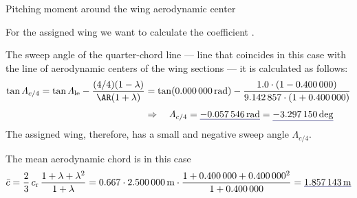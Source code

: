 \documentclass[[12pt,twoside]{book}
\begin{document}
\begin{myExampleX}{Pitching moment around the wing aerodynamic center}{}
\smallskip
\noindent
{}

\smallskip
\noindent
{}

\smallskip
\noindent
{}

\smallskip
For the assigned wing we want to calculate the coefficient .

\medskip
The sweep angle of the quarter-chord line --- line that coincides in this case with the line of aerodynamic centers of the wing sections --- it is calculated as follows:
\[
\begin{split}
\tan
\Lambda_{c/4}
   = \tan\Lambda_\mathrm{le}-\dfrac{(4/4)(1-\lambda)}{\AR(1+\lambda)}
   & {}=
    \tan (\SI[round-precision=0]{\mySweepLEWingRAD}{\radian})
      - \dfrac{
         \num[round-precision=2]{1.0}
         \cdot (1-\SI[round-precision=2]{\myTaperRatioWing}{})
      }{
         \num[round-precision=2]{\myAspectRatioWing}
         \cdot (1+\SI[round-precision=2]{\myTaperRatioWing}{})} 
\\[3pt]
   & \Rightarrow
   \quad
   \Lambda_{c/4}
      = \mathunderline{mydarkblue}{ \SI[round-precision=4]{\mySweepQuarterChordWingRAD}{\radian} }
      = \mathunderline{mydarkblue}{ \SI[round-precision=1]{\mySweepQuarterChordWingDEG}{\deg} }
\end{split}
\]
The assigned wing, therefore, has a small and negative sweep angle $\Lambda_{c/4}$.

The mean aerodynamic chord is in this case
\[
\bar{c} = \frac{2}{3} \, c_\mathrm{r} \, \frac{1+\lambda + \lambda^2}{1+\lambda}
  =
    \num{0.667} \cdot \SI[round-precision=2]{\myChordRootWingMT}{\metre}
      \cdot 
        \frac{
          1 + \SI[round-precision=2]{\myTaperRatioWing}{} + \SI[round-precision=2]{\myTaperRatioWing}{}^2
        }{
          1 + \SI[round-precision=2]{\myTaperRatioWing}{}
        }
    = \mathunderline{mydarkblue}{ \SI[round-precision=2]{\myMACWingMT}{\metre} }
\]


\end{myExampleX}
\end{document}
